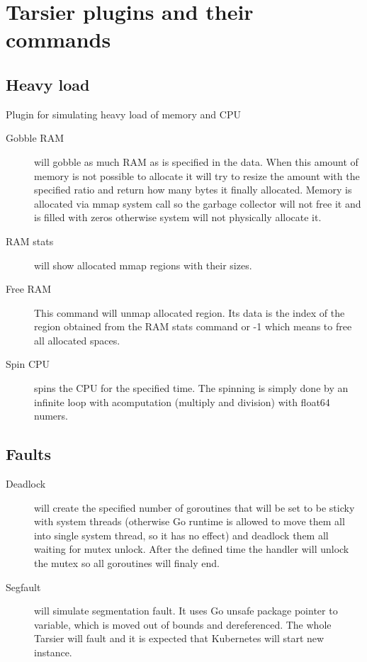 \section{Tarsier plugins and their commands}

\subsection{Heavy load}
Plugin for simulating heavy load of memory and CPU
\begin{description}
  \item[Gobble RAM] will gobble as much RAM as is specified in the data. When this amount of memory is not possible to allocate it will try to resize the amount with the specified ratio and return how many bytes it finally allocated. Memory is allocated via mmap system call so the garbage collector will not free it and is filled with zeros otherwise system will not physically allocate it.
  \item[RAM stats] will show allocated mmap regions with their sizes.
  \item[Free RAM] This command will unmap allocated region. Its data is the index of the region obtained from the RAM stats command or -1 which means to free all allocated spaces.
  \item[Spin CPU] spins the CPU for the specified time. The spinning is simply done by an infinite loop with acomputation (multiply and division) with float64 numers.
\end{description}

\subsection{Faults}
\begin{description}
  \item[Deadlock] will create the specified number of goroutines that will be set to be sticky with system threads (otherwise Go runtime is allowed to move them all into single system thread, so it has no effect) and deadlock them all waiting for mutex unlock. After the defined time the handler will unlock the mutex so all goroutines will finaly end.
  \item[Segfault] will simulate segmentation fault. It uses Go unsafe package pointer to variable, which is moved out of bounds and dereferenced. The whole Tarsier will fault and it is expected that Kubernetes will start new instance.
\end{description}

